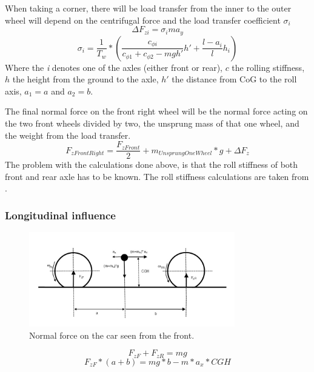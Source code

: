 When taking a corner, there will be load transfer from the inner to the outer wheel will depend on the centrifugal force and the load transfer coefficient $ \sigma_{i} $
\begin{equation}
	\Delta F_{zi} = \sigma_{i} ma_{y}
\end{equation}
\begin{equation}
	\sigma_{i} = \frac{1}{T_{w}}*( \frac{c_{\phi i}}{c_{\phi 1}+c_{\phi 2} - mgh'}h' + \frac{l-a_{i}}{l}h_{i}) 
\end{equation}
Where the \textit{i} denotes one of the axles (either front or rear), $ c $ the rolling stiffness, $ h $ the height from the ground to the axle, $ h' $ the distance from CoG to the roll axis, $ a_{1} = a $ and $ a_{2} = b $.

The final normal force on the front right wheel will be the normal force acting on the two front wheels divided by two, the unsprung mass of that one wheel, and the weight from the load transfer.
\begin{equation}
	F_{zFrontRight} = \frac{F_{zFront}}{2} + m_{UnsprungOneWheel}*g + \Delta F_{z}
\end{equation}
The problem with the calculations done above, is that the roll stiffness of both front and rear axle has to be known. The roll stiffness calculations are taken from \cite{pacejka}.



\subsubsection{Longitudinal influence}

\begin{figure}[h]
	\centering
	\includegraphics[width=0.8\textwidth]{Pictures/normal_force_longitudinal}
	\caption{Normal force on the car seen from the front.}
	\label{normal_force_longitudinal}
\end{figure}
\begin{equation} \label{eq:normal_2}
	F_{zF} + F_{zR} = mg
\end{equation}
\begin{equation} \label{eq:normal_with_long_acc}
	F_{zF}*(a+b) = mg*b - m*a_{x}*CGH
\end{equation}

